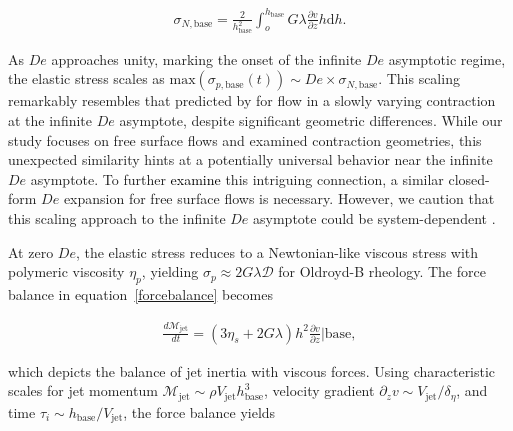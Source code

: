 \documentclass{jfm}
\newcommand{\DL}[1]{{\textcolor{black}{#1}}}
\newcommand{\VS}[1]{{\textcolor{black}{#1}}}
\newcommand{\oo}{\color{magenta} \normalfont}
\newcommand{\bb}{\color{black} \normalfont}
\begin{document}
\begin{align}
	\sigma_{N,\text{base}} =  \frac{2}{h_{\text{base}}^2}\int_{o}^{h_{\text{base}}} G\lambda\frac{\partial v}{\partial z} h\mathrm{d}h.
\end{align}

\oo
As $De$ approaches unity, marking the onset of the infinite $De$ asymptotic regime, the elastic stress scales as $\text{max}(\sigma_{p,\text{base}}(t)) \sim De \times \sigma_{N,\text{base}}$.
This scaling remarkably resembles that predicted by \citet{boyko2024flow} for flow in a slowly varying contraction at the infinite $De$ asymptote, despite significant geometric differences. While our study focuses on free surface flows and \citet{boyko2024flow} examined contraction geometries, this unexpected similarity hints at a potentially universal behavior near the infinite $De$ asymptote. To further \VS{examine} this intriguing connection, a similar closed-form $De$ expansion for free surface flows is necessary. However, we caution that this scaling approach to the infinite $De$ asymptote could be system-dependent \citep{hinch2024fast}.

At zero $De$, the elastic stress reduces to a Newtonian-like viscous stress with polymeric viscosity $\eta_p$, yielding $\sigma_p \approx 2G\lambda\boldsymbol{\mathcal{D}}$ for Oldroyd-B rheology. The force balance in equation~\eqref{forcebalance} becomes
\bb

\begin{align}
	\frac{d \mathcal{M}_\text{jet}}{d t} = \left(3\eta_s + 2G\lambda\right)h^2\frac{\partial v}{\partial z}\Bigg|{\text{base}},
	\label{etaeffect}
\end{align}

\noindent which depicts the balance of jet inertia with viscous forces.
\oo Using characteristic scales for jet momentum $\mathcal{M}_{\text{jet}} \sim \rho V_\text{jet} h_{\text{base}}^3$, velocity gradient $\partial_zv \sim V_{\text{jet}}/\delta_\eta$, and time $\tau_i \sim h_{\text{base}}/V_\text{jet}$, the force balance yields\bb
\end{document}
